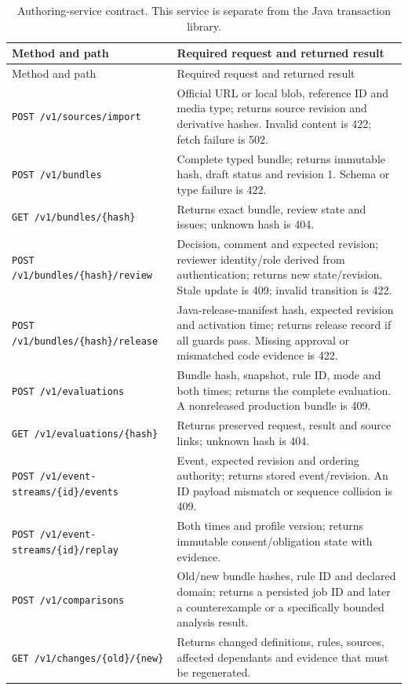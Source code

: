 \documentclass[12pt,a4paper,oneside,openany]{book}
\begin{document}
\begin{longtable}{P{0.36\textwidth}P{0.54\textwidth}}
\caption{Authoring-service contract. This service is separate from the Java
transaction library.}\\
\toprule Method and path & Required request and returned result \\\midrule
\endfirsthead
\toprule Method and path & Required request and returned result \\\midrule
\endhead
\texttt{POST /v1/sources/import} & Official URL or local blob, reference ID and media type; returns source revision and derivative hashes. Invalid content is 422; fetch failure is 502.\\
\texttt{POST /v1/bundles} & Complete typed bundle; returns immutable hash, draft status and revision 1. Schema or type failure is 422.\\
\texttt{GET /v1/bundles/\{hash\}} & Returns exact bundle, review state and issues; unknown hash is 404.\\
\texttt{POST /v1/bundles/\{hash\}/review} & Decision, comment and expected revision; reviewer identity/role derived from authentication; returns new state/revision. Stale update is 409; invalid transition is 422.\\
\texttt{POST /v1/bundles/\{hash\}/release} & Java-release-manifest hash, expected revision and activation time; returns release record if all guards pass. Missing approval or mismatched code evidence is 422.\\
\texttt{POST /v1/evaluations} & Bundle hash, snapshot, rule ID, mode and both times; returns the complete evaluation. A nonreleased production bundle is 409.\\
\texttt{GET /v1/evaluations/\{hash\}} & Returns preserved request, result and source links; unknown hash is 404.\\
\texttt{POST /v1/event-streams/\{id\}/events} & Event, expected revision and ordering authority; returns stored event/revision. An ID payload mismatch or sequence collision is 409.\\
\texttt{POST /v1/event-streams/\{id\}/replay} & Both times and profile version; returns immutable consent/obligation state with evidence.\\
\texttt{POST /v1/comparisons} & Old/new bundle hashes, rule ID and declared domain; returns a persisted job ID and later a counterexample or a specifically bounded analysis result.\\
\texttt{GET /v1/changes/\{old\}/\{new\}} & Returns changed definitions, rules, sources, affected dependants and evidence that must be regenerated.\\
\bottomrule
\end{longtable}
\endgroup
\end{document}
